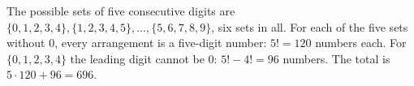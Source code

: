 The possible sets of five consecutive digits are $\{0,1,2,3,4\},\{1,2,3,4,5\},\dots,\{5,6,7,8,9\}$, six sets in all. For each of the five sets without $0$, every arrangement is a five-digit number: $5!=120$ numbers each. For $\{0,1,2,3,4\}$ the leading digit cannot be $0$: $5!-4!=96$ numbers. The total is $5\cdot120+96=\boxed{696}$.
